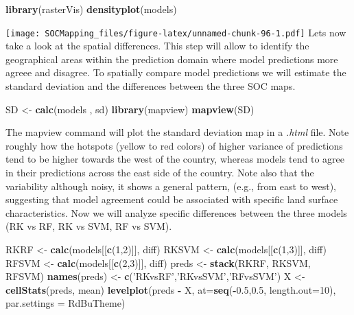 \documentclass[10pt,b5paper,]{book}
\newenvironment{Shaded}{\begin{snugshade}}{\end{snugshade}}
\newcommand{\DataTypeTok}[1]{\textcolor[rgb]{0.13,0.29,0.53}{#1}}
\newcommand{\DecValTok}[1]{\textcolor[rgb]{0.00,0.00,0.81}{#1}}
\newcommand{\FloatTok}[1]{\textcolor[rgb]{0.00,0.00,0.81}{#1}}
\newcommand{\KeywordTok}[1]{\textcolor[rgb]{0.13,0.29,0.53}{\textbf{#1}}}
\newcommand{\NormalTok}[1]{#1}
\newcommand{\OperatorTok}[1]{\textcolor[rgb]{0.81,0.36,0.00}{\textbf{#1}}}
\newcommand{\StringTok}[1]{\textcolor[rgb]{0.31,0.60,0.02}{#1}}
\theoremstyle{definition}
\theoremstyle{definition}
\theoremstyle{definition}
\theoremstyle{remark}
\begin{document}
\begin{Shaded}
\begin{Highlighting}[]
\KeywordTok{library}\NormalTok{(rasterVis)}
\KeywordTok{densityplot}\NormalTok{(models)}
\end{Highlighting}
\end{Shaded}

\texttt{[image: SOCMapping\_files/figure-latex/unnamed-chunk-96-1.pdf]}
Lets now take a look at the spatial differences. This step will allow to
identify the geographical areas within the prediction domain where model
predictions more agreee and disagree. To spatially compare model
predictions we will estimate the standard deviation and the differences
between the three SOC maps.

\begin{Shaded}
\begin{Highlighting}[]
\NormalTok{SD <-}\StringTok{ }\KeywordTok{calc}\NormalTok{(models , sd)}
\KeywordTok{library}\NormalTok{(mapview)}
\KeywordTok{mapview}\NormalTok{(SD)}
\end{Highlighting}
\end{Shaded}

The mapview command will plot the standard deviation map in a
\emph{.html} file. Note roughly how the hotspots (yellow to red colors)
of higher variance of predictions tend to be higher towards the west of
the country, whereas models tend to agree in their predictions across
the east side of the country. Note also that the variability although
noisy, it shows a general pattern, (e.g., from east to west), suggesting
that model agreement could be associated with specific land surface
characteristics. Now we will analyze specific differences between the
three models (RK vs RF, RK vs SVM, RF vs SVM).

\begin{Shaded}
\begin{Highlighting}[]
\NormalTok{RKRF  <-}\StringTok{ }\KeywordTok{calc}\NormalTok{(models[[}\KeywordTok{c}\NormalTok{(}\DecValTok{1}\NormalTok{,}\DecValTok{2}\NormalTok{)]], diff)}
\NormalTok{RKSVM <-}\StringTok{ }\KeywordTok{calc}\NormalTok{(models[[}\KeywordTok{c}\NormalTok{(}\DecValTok{1}\NormalTok{,}\DecValTok{3}\NormalTok{)]], diff)}
\NormalTok{RFSVM <-}\StringTok{ }\KeywordTok{calc}\NormalTok{(models[[}\KeywordTok{c}\NormalTok{(}\DecValTok{2}\NormalTok{,}\DecValTok{3}\NormalTok{)]], diff)}
\NormalTok{preds <-}\StringTok{ }\KeywordTok{stack}\NormalTok{(RKRF, RKSVM, RFSVM)}
\KeywordTok{names}\NormalTok{(preds) <-}\StringTok{ }\KeywordTok{c}\NormalTok{(}\StringTok{'RKvsRF'}\NormalTok{,}\StringTok{'RKvsSVM'}\NormalTok{,}\StringTok{'RFvsSVM'}\NormalTok{)}
\NormalTok{X <-}\StringTok{ }\KeywordTok{cellStats}\NormalTok{(preds, mean)}
\KeywordTok{levelplot}\NormalTok{(preds }\OperatorTok{-}\StringTok{ }\NormalTok{X, }\DataTypeTok{at=}\KeywordTok{seq}\NormalTok{(}\OperatorTok{-}\FloatTok{0.5}\NormalTok{,}\FloatTok{0.5}\NormalTok{, }\DataTypeTok{length.out=}\DecValTok{10}\NormalTok{), }\DataTypeTok{par.settings =}\NormalTok{ RdBuTheme)}
\end{Highlighting}
\end{Shaded}
\end{document}
